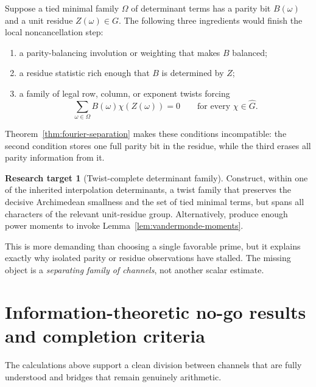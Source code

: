 \documentclass[11pt,oneside]{article}
\theoremstyle{definition}
\newtheorem{problem}[theorem]{Research target}
\theoremstyle{remark}
\begin{document}
Suppose a tied minimal family \(\Omega\) of determinant terms has a parity bit \(B(\omega)\) and a unit residue \(Z(\omega)\in G\).  The following three ingredients would finish the local noncancellation step:
\begin{enumerate}
 \item a parity-balancing involution or weighting that makes \(B\) balanced;
 \item a residue statistic rich enough that \(B\) is determined by \(Z\);
 \item a family of legal row, column, or exponent twists forcing
 \begin{equation}\label{eq:twisted-cancel-family}
  \sum_{\omega\in\Omega}B(\omega)\chi(Z(\omega))=0
  \qquad\text{for every }\chi\in\widehat G.
 \end{equation}
\end{enumerate}
Theorem~\ref{thm:fourier-separation} makes these conditions incompatible: the second condition stores one full parity bit in the residue, while the third erases all parity information from it.

\begin{problem}[Twist-complete determinant family]\label{prob:twist-complete}
Construct, within one of the inherited interpolation determinants, a twist family that preserves the decisive Archimedean smallness and the set of tied minimal terms, but spans all characters of the relevant unit-residue group.  Alternatively, produce enough power moments to invoke Lemma~\ref{lem:vandermonde-moments}.
\end{problem}

This is more demanding than choosing a single favorable prime, but it explains exactly why isolated parity or residue observations have stalled.  The missing object is a \emph{separating family of channels}, not another scalar estimate.

\section{Information-theoretic no-go results and completion criteria}\label{sec:no-go}

The calculations above support a clean division between channels that are fully understood and bridges that remain genuinely arithmetic.
\end{document}

